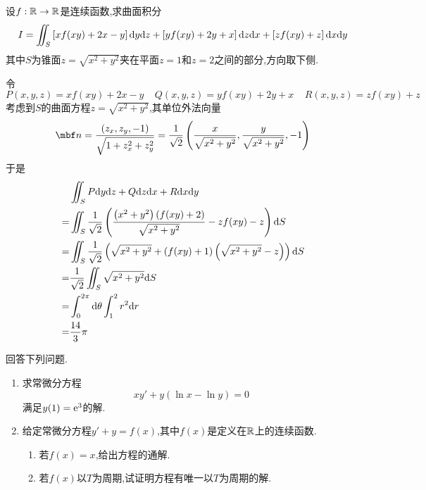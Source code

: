 \documentclass{ctexart}
\begin{document}
\begin{problem}[3.(20\songti{分})]
    设$f:\mathbb{R}\to\mathbb{R}$是连续函数,求曲面积分
    \[I=\iint_S\left[xf(xy)+2x-y\right]\mathrm{d} y\mathrm{d} z+\left[yf(xy)+2y+x\right]\mathrm{d} z\mathrm{d} x+\left[zf(xy)+z\right]\mathrm{d} x\mathrm{d} y\]
    其中$S$为锥面$z=\sqrt{x^2+y^2}$夹在平面$z=1$和$z=2$之间的部分,方向取下侧.
\end{problem}
\begin{solution}
    令
    \[P(x,y,z)=xf(xy)+2x-y\ \ \ \ \ Q(x,y,z)=yf(xy)+2y+x\ \ \ \ \ R(x,y,z)=zf(xy)+z\]
    考虑到$S$的曲面方程$z=\sqrt{x^2+y^2}$,其单位外法向量
    \[\mbf n=\dfrac{\left(z_x,z_y,-1\right)}{\sqrt{1+z_x^2+z_y^2}}
    =\dfrac{1}{\sqrt2}\left(\dfrac{x}{\sqrt{x^2+y^2}},\dfrac{y}{\sqrt{x^2+y^2}},-1\right)\]
    于是
    \[\begin{aligned}
        &\iint_{S}P\mathrm{d} y\mathrm{d} z+Q\mathrm{d} z\mathrm{d} x+R\mathrm{d} x\mathrm{d} y\\
        =&\iint_{S}\dfrac{1}{\sqrt2}\left(\dfrac{\left(x^2+y^2\right)\left(f(xy)+2\right)}{\sqrt{x^2+y^2}}-zf(xy)-z\right)\mathrm{d} S \\
        =&\iint_{S}\dfrac{1}{\sqrt2}\left(\sqrt{x^2+y^2}+\left(f(xy)+1\right)\left(\sqrt{x^2+y^2}-z\right)\right)\mathrm{d} S \\
        =&\dfrac{1}{\sqrt2}\iint_{S}\sqrt{x^2+y^2}\mathrm{d} S \\
        =&\int_0^{2\pi}\mathrm{d}\theta\int_1^2r^2\mathrm{d} r \\
        =&\dfrac{14}{3}\pi
    \end{aligned}\]
\end{solution}
\begin{problem}[4.(20\songti{分})]
    回答下列问题.
    \begin{enumerate}[label=\tbf{(\arabic*)}]
        \item 求常微分方程
            \[xy'+y\left(\ln x-\ln y\right)=0\]
            满足$y(1)=\mathrm{e}^3$的解.
        \item 给定常微分方程$y'+y=f(x)$,其中$f(x)$是定义在$\mathbb{R}$上的连续函数.
            \begin{enumerate}[label=\tbf{(\alph*)}]
                \item 若$f(x)=x$,给出方程的通解.
                \item 若$f(x)$以$T$为周期,试证明方程有唯一以$T$为周期的解.
            \end{enumerate}
    \end{enumerate}    
\end{problem}
\end{document}
